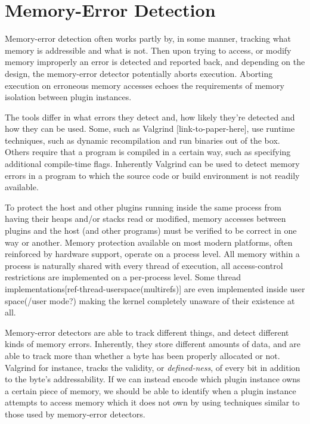 \chapter {Memory-Error Detection}

Memory-error detection often works partly by, in some manner, tracking what
memory is addressible and what is not. Then upon trying to access, or modify
memory improperly an error is detected and reported back, and depending on the
design, the memory-error detector potentially aborts execution. Aborting
execution on erroneous memory accesses echoes the requirements of memory
isolation between plugin instances.

The tools differ in what errors they detect and, how likely they're detected and
how they can be used. Some, such as Valgrind [link-to-paper-here], use runtime
techniques, such as dynamic recompilation and run binaries out of the box.
Others require that a program is compiled in a certain way, such as specifying
additional compile-time flags. Inherently Valgrind can be used to detect memory
errors in a program to which the source code or build environment is not readily
available.

To protect the host and other plugins running inside the same process from
having their heaps and/or stacks read or modified, memory accesses between
plugins and the host (and other programs) must be verified to be correct in one
way or another. Memory protection available on most modern platforms, often
reinforced by hardware support, operate on a process level. All memory within a
process is naturally shared with every thread of execution, all access-control
restrictions are implemented on a per-process level. Some thread
implementations[ref-thread-userspace(multirefs)] are even implemented inside
user space(/user mode?) making the kernel completely unaware of their
existence at all.

Memory-error detectors are able to track different things, and detect different
kinds of memory errors. Inherently, they store different amounts of data, and
are able to track more than whether a byte has been properly allocated or not.
Valgrind for instance, tracks the validity, or \emph{defined-ness}, of every bit
in addition to the byte's addressability. If we can instead encode which plugin
instance owns a certain piece of memory, we should be able to identify when a
plugin instance attempts to access memory which it does not own by using
techniques similar to those used by memory-error detectors.

